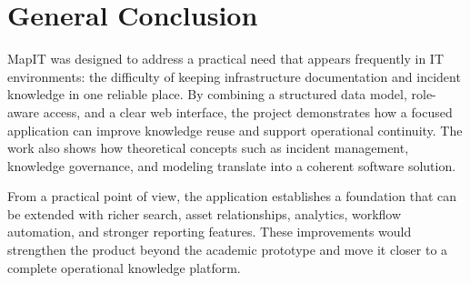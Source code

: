 \chapter*{General Conclusion}
MapIT was designed to address a practical need that appears frequently in IT environments: the difficulty of keeping infrastructure documentation and incident knowledge in one reliable place. By combining a structured data model, role-aware access, and a clear web interface, the project demonstrates how a focused application can improve knowledge reuse and support operational continuity. The work also shows how theoretical concepts such as incident management, knowledge governance, and modeling translate into a coherent software solution.

From a practical point of view, the application establishes a foundation that can be extended with richer search, asset relationships, analytics, workflow automation, and stronger reporting features. These improvements would strengthen the product beyond the academic prototype and move it closer to a complete operational knowledge platform.
